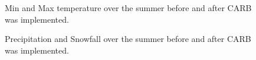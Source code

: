 \documentclass{article}
\begin{document}
\begin{figure}[h]

\caption{\label{fig:control_doyA1}Min and Max temperature over the summer before and after CARB was implemented.}
\end{figure}

\begin{figure}[h]

\caption{\label{fig:control_doyB1}Precipitation and Snowfall over the summer before and after CARB was implemented.}
\end{figure}
\end{document}
